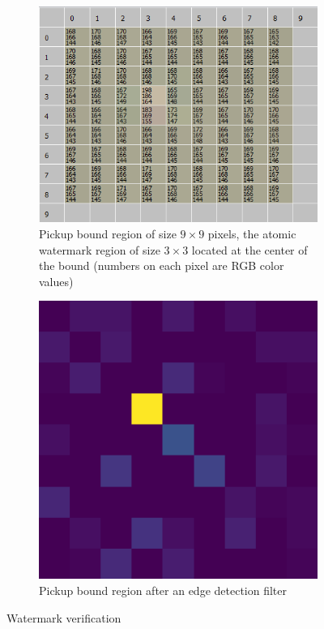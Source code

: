 \begin{figure}[ht]
    \centering
    \begin{subfigure}[t]{0.45\textwidth}
        \includegraphics[width=\textwidth]{coca_cola_bound.png}
        \caption{Pickup bound region of size $9\times9$ pixels, the atomic watermark region of size $3\times3$ located at the center of the bound (numbers on each pixel are RGB color values)}
        \label{subfig:coca_cola_pickup}
    \end{subfigure}
    \qquad
    \begin{subfigure}[t]{0.45\textwidth}
        \includegraphics[width=\textwidth]{coca_cola_laplace.png}
        \caption{Pickup bound region after an edge detection filter}
        \label{subfig:coca_cola_pickup_filtered}
    \end{subfigure}
    \caption{Watermark verification}
    \label{fig:coca_cola_bound}
\end{figure}

